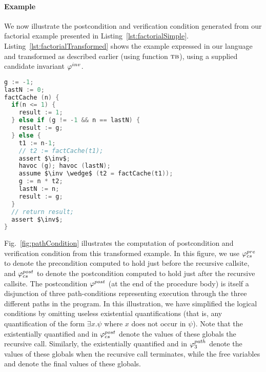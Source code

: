 \paragraph{Example}
We now illustrate the postcondition and verification condition generated from our factorial example
presented in Listing~\ref{lst:factorialSimple}. Listing~\ref{lst:factorialTransformed} shows the example
expressed in our language and transformed as described earlier (using function $\textsc{tb}$), using a
supplied candidate invariant $\varphi^{inv}$.

\begin{lstlisting}[float,language=c,mathescape=true, caption= {Procedure factorial from
      Listing~\ref{lst:factorialSimple} transformed to incorporate a supplied candidate
      invariant $\inv$.}, label=lst:factorialTransformed]
g := -1;
lastN := 0;
factCache (n) {
  if(n <= 1) {
    result := 1;
  } else if (g != -1 && n == lastN) {
    result := g;
  } else {
    t1 := n-1;
    // t2 := factCache(t1);
    assert $\inv$;
    havoc (g); havoc (lastN);
    assume $\inv \wedge$ (t2 = factCache(t1));
    g := n * t2;
    lastN := n;
    result := g;
  }
  // return result;
  assert $\inv$;
}
\end{lstlisting}

Fig.~\ref{fig:pathCondition} illustrates the computation of postcondition and verification condition from
this transformed example. In this figure, we use $\varphi^{pre}_{cs}$ to denote the precondition computed to hold
just before the recursive callsite, and $\varphi^{post}_{cs}$ to denote the postcondition computed to hold just
after the recursive callsite. The postcondition $\varphi^{post}$ (at the end of the procedure body) is itself
a disjunction of three path-conditions representing execution through the three different paths in
the program. In this illustration, we have simplified the logical conditions by omitting useless existential
quantifications (that is, any quantification of the form $\exists x. \psi$ where $x$ does not occur in $\psi$).
Note that the existentially quantified  and  in $\varphi^{post}_{cs}$ denote the values of these
globals  the recursive call. Similarly, the existentially quantified  and  in
$\varphi^{path}_3$ denote the values of these globals when the recursive call terminates, while the free variables
 and  denote the final values of these globals.

